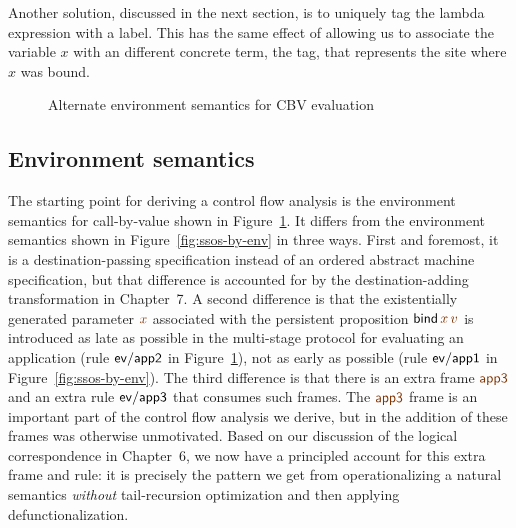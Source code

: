 Another solution, discussed in the next
section, is to uniquely tag the lambda expression with a label. This
has the same effect of allowing us to associate the variable $x$
with an different concrete term, the tag, that represents the site
where $x$ was bound.






\begin{figure}
\caption{Alternate environment semantics for CBV evaluation}
\label{fig:dest-env}
\end{figure}

\subsection{Environment semantics}


The starting point for deriving a control flow analysis is the
environment semantics for call-by-value shown in
Figure~\ref{fig:dest-env}. It differs from the environment semantics
shown in Figure~\ref{fig:ssos-by-env} in three ways. First and
foremost, it is a destination-passing specification instead of an
ordered abstract machine specification, but that difference is
accounted for by the destination-adding transformation in Chapter~7.
A second difference is that the existentially generated parameter
$\lf{x}$ associated with the persistent proposition ${\sf
  bind}\,\lf{x}\,\lf{v}$ is introduced as late as possible in the
multi-stage protocol for evaluating an application (rule ${\sf
  ev/app2}$ in Figure~\ref{fig:dest-env}), not as early as possible
(rule ${\sf ev/app1}$ in Figure~\ref{fig:ssos-by-env}). The third
difference is that there is an extra frame $\lf{\sf app3}$ and an
extra rule ${\sf ev/app3}$ that consumes such frames. The $\lf{\sf
  app3}$ frame is an important part of the control flow analysis we
derive, but in \cite{simmons11logical} the addition of these frames
was otherwise unmotivated. Based on our discussion of the logical
correspondence in Chapter~6, we now have a principled account for this
extra frame and rule: it is precisely the pattern we get from
operationalizing a natural semantics {\it without} tail-recursion
optimization and then applying defunctionalization.

